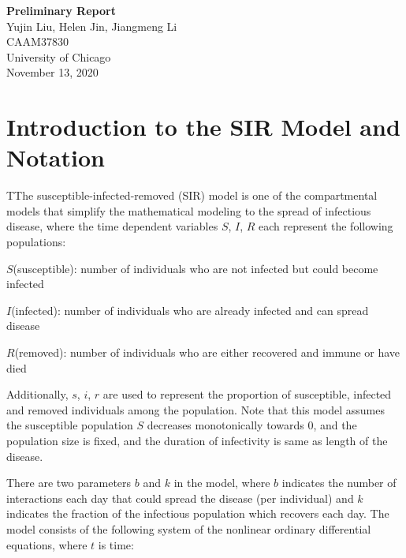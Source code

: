 \documentclass{article}
\begin{document}
\begin{titlepage}
  \begin{center}

    \huge
    \textbf{Preliminary Report}\\
    \vspace{4.5cm}
    \LARGE
    Yujin Liu, Helen Jin, Jiangmeng Li\\
    \vspace{4.5cm}
    \Large
    CAAM37830\\
    \vspace{1cm}
    University of Chicago\\
    \vspace{1cm}
    November 13, 2020

  \end{center}

\end{titlepage}







\section{Introduction to the SIR Model and Notation}

TThe susceptible-infected-removed (SIR) model is one of the compartmental models that simplify the mathematical modeling to the spread of infectious disease, where the time dependent variables $S$, $I$, $R$ each represent the following populations:

$S$(susceptible): number of individuals who are not infected but could become infected

$I$(infected): number of individuals who are already infected and can spread disease

$R$(removed): number of individuals who are either recovered and immune or have died

Additionally, $s$, $i$, $r$ are used to represent the proportion of susceptible, infected and removed individuals among the population. Note that this model assumes the susceptible population $S$ decreases monotonically towards 0, and the population size is fixed, and the duration of infectivity is same as length of the disease.

There are two parameters $b$ and $k$ in the model, where $b$ indicates the number of interactions each day that could spread the disease (per individual) and $k$ indicates the fraction of the infectious population which recovers each day. The model consists of the following system of the nonlinear ordinary differential equations, where $t$ is time:
\end{document}
